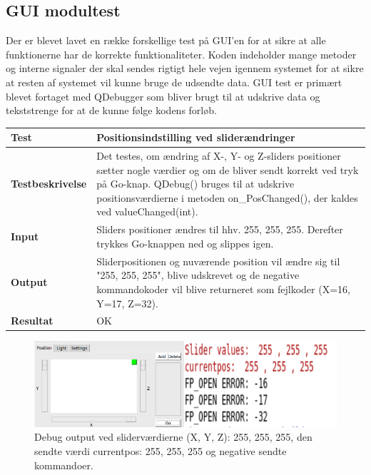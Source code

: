 \subsection{GUI modultest}
Der er blevet lavet en række forskellige test på GUI'en for at sikre at alle funktionerne har de korrekte funktionaliteter. Koden indeholder mange metoder og interne signaler der skal sendes rigtigt hele vejen igennem systemet for at sikre at resten af systemet vil kunne bruge de udsendte data. GUI test er primært blevet fortaget med QDebugger som bliver brugt til at udskrive data og tekststrenge for at de kunne følge kodens forløb. \newline

\begin{table}[H]
\begin{tabular}{|l|l|}\hline
\textbf{Test} & Positionsindstilling ved sliderændringer \\\hline

\textbf{Testbeskrivelse} & \multicolumn{1}{|m{11.5cm}|}{Det testes, om ændring af X-, Y- og Z-sliders positioner sætter nogle værdier og om de bliver sendt korrekt ved tryk på Go-knap.  QDebug() bruges til at udskrive positionsværdierne i metoden on\_PosChanged(), der kaldes ved valueChanged(int).} \\\hline


\textbf{Input} & \multicolumn{1}{|m{11.5cm}|}{Sliders positioner ændres til hhv. 255, 255, 255. Derefter trykkes Go-knappen ned og slippes igen.} \\\hline

\textbf{Output} & \multicolumn{1}{|m{11.5cm}|}{ Sliderpositionen og nuværende position vil ændre sig til "255, 255, 255", blive udskrevet og de negative kommandokoder vil blive returneret som fejlkoder (X=16, Y=17, Z=32).} \\\hline

\textbf{Resultat} & \multicolumn{1}{|m{11.5cm}|}{ OK} \\\hline

\end{tabular}
\end{table}

\begin{figure}[H]
\centering
\includegraphics[width=0.9\linewidth]{0_Filer/Figuer/testPosition.png}
\caption{Debug output ved sliderværdierne (X, Y, Z): 255, 255, 255, den sendte værdi currentpos: 255, 255, 255 og negative sendte kommandoer.}
\label{fig:testPosition}
\end{figure}


